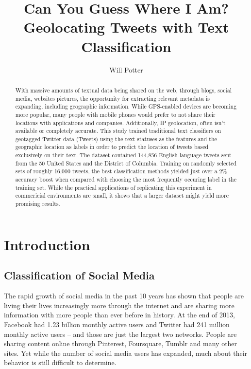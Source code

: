 \documentclass[midd]{thesis}
\title {Can You Guess Where I Am?\\ Geolocating Tweets with Text Classification}
\author {Will Potter}
\begin{document}
\maketitle

\begin{abstract}
With massive amounts of textual data being shared on the web, through blogs, social media, websites pictures, the opportunity for extracting relevant metadata is expanding, including geographic information. While GPS-enabled devices are becoming more popular, many people with mobile phones would prefer to not share their locations with applications and companies. Additionally, IP geolocation, often isn't available or completely accurate.  This study trained traditional text classifiers on geotagged Twitter data (Tweets) using the text statuses as the features and the geographic location as labels in order to predict the location of tweets based exclusively on their text. The dataset contained 144,856 English-language tweets sent from the 50 United States and the District of Columbia. Training on randomly selected sets of roughly 16,000 tweets, the best classification methods yielded just over a 2\% accuracy boost when compared with choosing the most frequently occuring label in the training set. While the practical applications of replicating this experiment in commericial environments are small, it shows that a larger dataset might yield more promising results.


\end{abstract}

\begin{acknowledgements}
% 
\end{acknowledgements}

\contentspage
\tablelistpage
\figurelistpage

\normalspacing \setcounter{page}{1} 

\chapter{Introduction}

\section{Classification of Social Media}

The rapid growth of social media in the past 10 years has shown that people are living their lives increasingly more through the internet and are sharing more information with more people than ever before in history. At the end of 2013, Facebook had 1.23 billion monthly active users \cite{facebookabout} and Twitter had 241 million monthly active users \cite{twitterabout} -- and those are just the largest two networks. People are sharing content online through Pinterest, Foursquare, Tumblr and many other sites. Yet while the number of social media users has expanded, much about their behavior is still difficult to determine.
\end{document}
